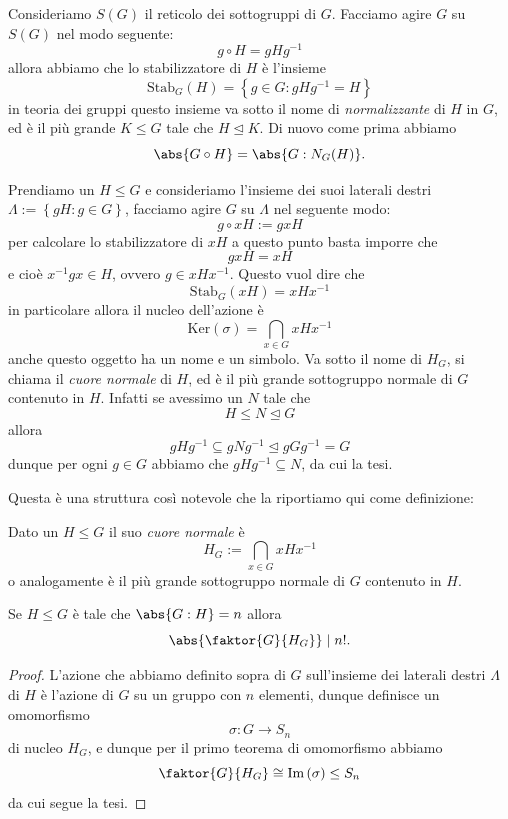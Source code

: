 \documentclass[11pt]{scrartcl}
\newcommand{\Immagine}[1]{\text{Im}\left(#1\right)}
\renewcommand{\ker}[1]{\text{Ker}\left(#1\right)}
\newcommand{\normal}{\mathrel{\unlhd}}
\begin{document}
	\begin{example}
		Consideriamo $S(G)$ il reticolo dei sottogruppi di $G$. Facciamo agire $G$ su $S(G)$ nel modo seguente:
		$$g\circ H=gHg^{-1}$$
		allora abbiamo che lo stabilizzatore di $H$ è l'insieme
		$$\text{Stab}_G(H)=\left\{g\in G:gHg^{-1}=H\right\}$$
		in teoria dei gruppi questo insieme va sotto il nome di \textit{normalizzante} di $H$ in $G$, ed è il più grande $K\le G$ tale che $H\normal K$. Di nuovo come prima abbiamo 
		$$\abs{G\circ H}=\abs{G:N_G(H)}.$$ 
	\end{example}
	\begin{example}
		Prendiamo un $H\le G$ e consideriamo l'insieme dei suoi laterali destri $\Lambda:=\left\{gH:g\in G\right\}$, facciamo agire $G$ su $\Lambda$ nel seguente modo:
		$$g\circ xH:=gxH$$
		per calcolare lo stabilizzatore di $xH$ a questo punto basta imporre che
		$$gxH=xH$$
		e cioè $x^{-1}gx\in H$, ovvero $g\in xHx^{-1}$. Questo vuol dire che
		$$\text{Stab}_G(xH)=xHx^{-1}$$
		in particolare allora il nucleo dell'azione è
		$$\ker\sigma=\bigcap_{x\in G}xHx^{-1}$$
		anche questo oggetto ha un nome e un simbolo. Va sotto il nome di $H_G$, si chiama il \textit{cuore normale} di $H$, ed è il più grande sottogruppo normale di $G$ contenuto in $H$. Infatti se avessimo un $N$ tale che
		$$H\le N\normal G$$
		allora 
		$$gHg^{-1}\subseteq gNg^{-1}\normal gGg^{-1}=G$$
		dunque per ogni $g\in G$ abbiamo che $gHg^{-1}\subseteq N$, da cui la tesi.
	\end{example}
	Questa è una struttura così notevole che la riportiamo qui come definizione:
	\begin{definition}
		Dato un $H\le G$ il suo \textit{cuore normale} è 
		$$H_G:=\bigcap_{x\in G}xHx^{-1}$$
		o analogamente è il più grande sottogruppo normale di $G$ contenuto in $H$.
	\end{definition}
	\begin{proposition}
		Se $H\le G$ è tale che $\abs{G:H}=n$ allora 
		$$\abs{\faktor{G}{H_G}}\mid n!.$$
	\end{proposition}
	\begin{proof}
		L'azione che abbiamo definito sopra di $G$ sull'insieme dei laterali destri $\Lambda$ di $H$ è l'azione di $G$ su un gruppo con $n$ elementi, dunque definisce un omomorfismo
		$$\sigma:G\to S_n$$
		di nucleo $H_G$, e dunque per il primo teorema di omomorfismo abbiamo
		$$\faktor{G}{H_G}\cong \Immagine{\sigma}\le S_n$$
		da cui segue la tesi.
	\end{proof}
\end{document}
